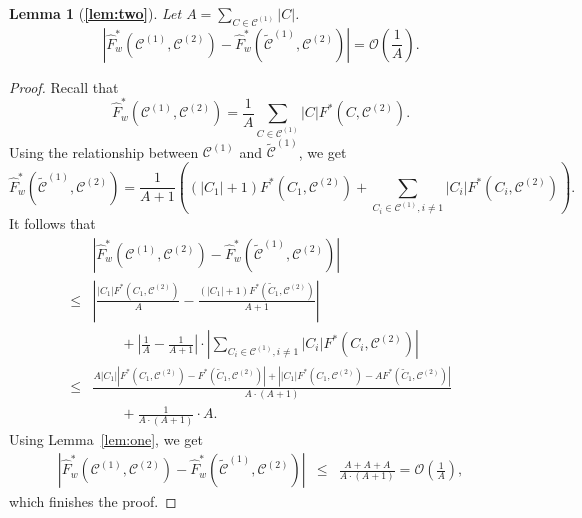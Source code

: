 \documentclass[11pt]{article}
\newtheorem*{lem*}{Lemma}
\theoremstyle{remark}
\newcommand\cCone{\mathcal{C}^{(1)}}
\newcommand\tcCone{\tilde{\mathcal{C}}^{(1)}}
\newcommand\cCtwo{\mathcal{C}^{(2)}}
\newcommand{\bigO}{\mathcal{O}}
\begin{document}
\begin{lem*}[\textbf{\ref{lem:two}}]
    Let $A = \sum_{C \in \cCone} |C|$.
    \begin{equation*}
        \left| \hat{F}^*_w(\cCone, \cCtwo) - \hat{F}^*_w(\tcCone, \cCtwo) \right| = \bigO\left(\frac{1}{A}\right).
    \end{equation*}
\end{lem*}
\begin{proof}
    Recall that
    \begin{equation*}
        \hat{F}^*_w(\cCone, \cCtwo) = \frac{1}{A} \sum_{C \in \cCone} |C|F^*(C, \cCtwo).
    \end{equation*}
    Using the relationship between $\cCone$ and $\tcCone$, we get
    \begin{equation*}
        \hat{F}^*_w(\tcCone, \cCtwo) = \frac{1}{A+1}\left((|C_1|+1)F^*(C_1, \cCtwo) + \sum_{C_i \in \cCone, i \neq 1} |C_i|F^*(C_i,\cCtwo)\right).
    \end{equation*}
    It follows that
    \begin{align*}
    & \left| \hat{F}^*_w (\cCone, \cCtwo) - \hat{F}^*_w (\tcCone, \cCtwo) \right| \\
    \le& \left| \frac {|C_1| F^*(C_1, \cCtwo)} {A} - \frac {(|C_1|+1) F^*(\tilde{C}_1, \cCtwo)} {A+1} \right| \\
    & \qquad + \left| \frac {1}{A} - \frac {1}{A+1} \right| \cdot \left| \sum_{C_i \in \cCone, i \neq 1} |C_i| F^*(C_i, \cCtwo) \right| \\
    \le& \frac {A |C_1| \left| F^*(C_1, \cCtwo) - F^*(\tilde{C}_1, \cCtwo) \right| + \left| |C_1| F^*(C_1, \cCtwo) - A F^*(\tilde{C}_1, \cCtwo) \right| }{A \cdot (A+1)} \\
    & \qquad + \frac {1}{A \cdot (A+1)} \cdot A.
    \end{align*}
    Using Lemma~\ref{lem:one}, we get 
    \begin{eqnarray*}
    \left| \hat{F}^*_w (\cCone, \cCtwo) - \hat{F}^*_w (\tcCone, \cCtwo) \right| &\le& \frac {A+A+A}{A \cdot (A+1)} = \bigO\left(\frac{1}{A}\right),
    \end{eqnarray*}
    which finishes the proof.
\end{proof}
\end{document}

